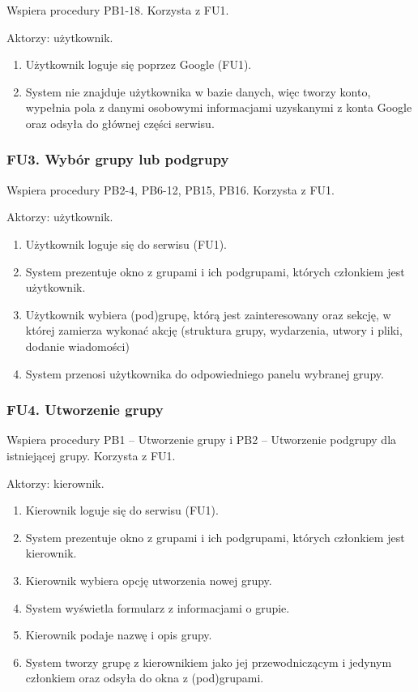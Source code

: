 \documentclass[11pt,a4paper]{article}
\renewcommand{\_}{\char`_}
\begin{document}
Wspiera procedury PB1-18. Korzysta z FU1.

Aktorzy: użytkownik.
\begin{enumerate}
    \item Użytkownik loguje się poprzez Google (FU1).
    \item System nie znajduje użytkownika w bazie danych, więc tworzy konto, wypełnia pola z danymi osobowymi informacjami uzyskanymi z konta Google oraz odsyła do głównej części serwisu.
\end{enumerate}

\subsubsection{FU3. Wybór grupy lub podgrupy}

Wspiera procedury PB2-4, PB6-12, PB15, PB16. Korzysta z FU1.

Aktorzy: użytkownik.
\begin{enumerate}
    \item Użytkownik loguje się do serwisu (FU1).
    \item System prezentuje okno z grupami i ich podgrupami, których członkiem jest użytkownik.
    \item Użytkownik wybiera (pod)grupę, którą jest zainteresowany oraz sekcję, w której zamierza wykonać akcję (struktura grupy, wydarzenia, utwory i pliki, dodanie wiadomości)
    \item System przenosi użytkownika do odpowiedniego panelu wybranej grupy.
\end{enumerate}

\subsubsection{FU4. Utworzenie grupy}

Wspiera procedury PB1 – Utworzenie grupy i PB2 – Utworzenie podgrupy dla istniejącej grupy. Korzysta z FU1.

Aktorzy: kierownik.
\begin{enumerate}
    \item Kierownik loguje się do serwisu (FU1).
    \item System prezentuje okno z grupami i ich podgrupami, których członkiem jest kierownik.
    \item Kierownik wybiera opcję utworzenia nowej grupy.
    \item System wyświetla formularz z informacjami o grupie.
    \item Kierownik podaje nazwę i opis grupy.
    \item System tworzy grupę z kierownikiem jako jej przewodniczącym i jedynym członkiem oraz odsyła do okna z (pod)grupami.
\end{enumerate}
\end{document}
